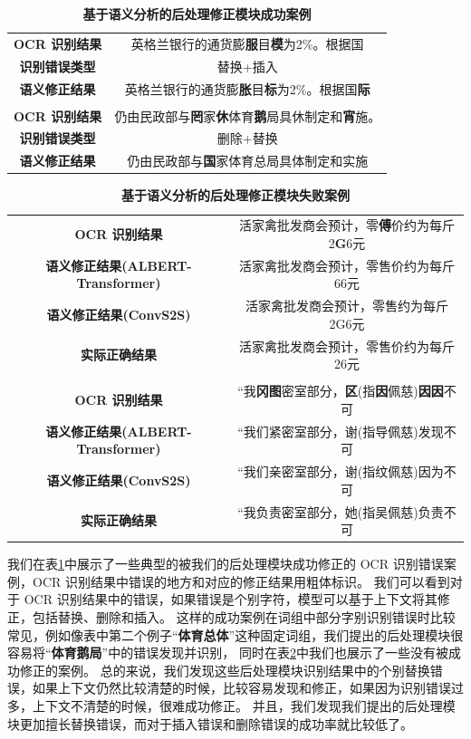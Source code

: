 \begin{table}[!hpt]
	\caption[]{\textbf{基于语义分析的后处理修正模块成功案例}}
	\label{tab:success}
	\centering
	\begin{tabular}{c c}
		\hline
		\textbf{OCR 识别结果} & 英格兰银行的通货膨\textbf{服}目\textbf{模}为2\%。根据国 \\
		\textbf{识别错误类型} & 替换+插入 \\
		\textbf{语义修正结果} & 英格兰银行的通货膨\textbf{胀}目\textbf{标}为2\%。根据国\textbf{际} \\
		\hline
		& \\
		\hline
		\textbf{OCR 识别结果} & 仍由民政部与\textbf{罔}家\textbf{休}体育\textbf{鹅}局具休制定和\textbf{宵}施。 \\
		\textbf{识别错误类型} & 删除+替换 \\
		\textbf{语义修正结果} & 仍由民政部与\textbf{国}家体育总局具体制定和实施 \\
		\hline
	\end{tabular}
\end{table}

\begin{table}[!hpt]
	\caption[]{\textbf{基于语义分析的后处理修正模块失败案例}}
	\label{tab:fail}
	\centering
	\begin{tabular}{c c}
		\hline
		\textbf{OCR 识别结果} & 活家禽批发商会预计，零\textbf{傅}价约为每斤2\textbf{G}6元 \\
		\textbf{语义修正结果(ALBERT-Transformer)} & 活家禽批发商会预计，零售价约为每斤66元 \\
		\textbf{语义修正结果(ConvS2S)} & 活家禽批发商会预计，零售约为每斤2G6元 \\
		\textbf{实际正确结果} & 活家禽批发商会预计，零售价约为每斤26元 \\
		\hline
		& \\
		\hline
		\textbf{OCR 识别结果} & “我\textbf{冈图}密室部分，\textbf{区}(指\textbf{因}佩慈)\textbf{因因}不可 \\
		\textbf{语义修正结果(ALBERT-Transformer)} & “我们紧密室部分，谢(指导佩慈)发现不可 \\
		\textbf{语义修正结果(ConvS2S)} & “我们亲密室部分，谢(指纹佩慈)因为不可 \\
		\textbf{实际正确结果} & “我负责密室部分，她(指吴佩慈)负责不可 \\
		\hline
	\end{tabular}
\end{table}

我们在表\ref{tab:success}中展示了一些典型的被我们的后处理模块成功修正的 OCR 识别错误案例，OCR 识别结果中错误的地方和对应的修正结果用粗体标识。
我们可以看到对于 OCR 识别结果中的错误，如果错误是个别字符，模型可以基于上下文将其修正，包括替换、删除和插入。
这样的成功案例在词组中部分字别识别错误时比较常见，例如像表中第二个例子“\textbf{体育总体}”这种固定词组，我们提出的后处理模块很容易将“\textbf{体育鹅局}”中的错误发现并识别，
同时在表\ref{tab:fail}中我们也展示了一些没有被成功修正的案例。
总的来说，我们发现这些后处理模块识别结果中的个别替换错误，如果上下文仍然比较清楚的时候，比较容易发现和修正，如果因为识别错误过多，上下文不清楚的时候，很难成功修正。
并且，我们发现我们提出的后处理模块更加擅长替换错误，而对于插入错误和删除错误的成功率就比较低了。

